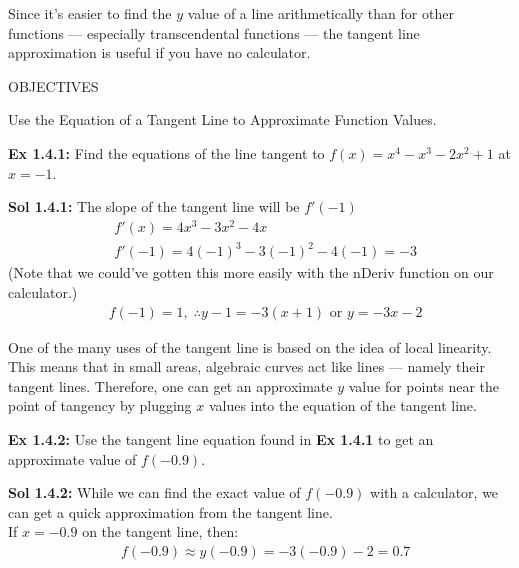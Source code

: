 Since it's easier to find the $y$ value of a line arithmetically than for other functions --- especially transcendental functions --- the tangent line approximation is useful if you have no calculator. \par

\begin{tcolorbox}[objective]
    \begin{center}
        OBJECTIVES \\[11pt]
    \end{center}
    Use the Equation of a Tangent Line to Approximate Function Values.
\end{tcolorbox}

\begin{tcolorbox}[example]
    \textbf{Ex 1.4.1: } Find the equations of the line tangent to $f(x) = x^4 - x^3 - 2x^2 + 1$ at $x = -1$. 
\end{tcolorbox}
\begin{tcolorbox}[solution]
    \textbf{Sol 1.4.1: } The slope of the tangent line will be $f'(-1)$ \begin{align*}
        & f'(x) = 4x^3 - 3x^2 - 4x \\[11pt]
        & f'(-1) = 4(-1)^3 - 3(-1)^2 - 4(-1) = -3 
    \end{align*} 
    (Note that we could've gotten this more easily with the nDeriv function on our calculator.) \begin{align*}
        & f(-1) = 1, \; \therefore \boxed{y - 1 = -3(x + 1)} \text{ or } \boxed{y = -3x - 2} 
    \end{align*} 
\end{tcolorbox}

One of the many uses of the tangent line is based on the idea of local linearity. This means that in small areas, algebraic curves act like lines --- namely their tangent lines. Therefore, one can get an approximate $y$ value for points near the point of tangency by plugging $x$ values into the equation of the tangent line. \par

\begin{tcolorbox}[example]
    \textbf{Ex 1.4.2: } Use the tangent line equation found in \textbf{Ex 1.4.1} to get an approximate value of $f(-0.9)$. 
\end{tcolorbox}
\begin{tcolorbox}[solution]
    \textbf{Sol 1.4.2: } While we can find the exact value of $f(-0.9)$ with a calculator, we can get a quick approximation from the tangent line. \\[11pt]
    If $x = -0.9$ on the tangent line, then: \begin{align*}
        & f(-0.9) \approx y(-0.9) = -3(-0.9) - 2 = \boxed{0.7}
    \end{align*}
\end{tcolorbox}

